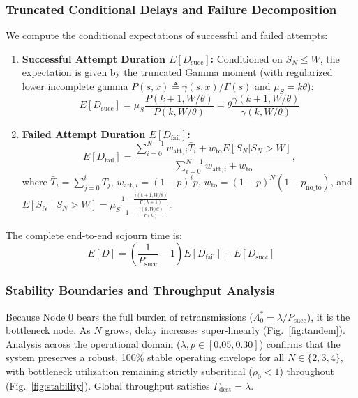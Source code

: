 \documentclass[journal,compsoc]{IEEEtran}
\begin{document}
\subsubsection{Truncated Conditional Delays and Failure Decomposition}
We compute the conditional expectations of successful and failed attempts:
\begin{enumerate}
    \item \textbf{Successful Attempt Duration $E[D_{\text{succ}}]$:} Conditioned on $S_N \le W$, the expectation is given by the truncated Gamma moment (with regularized lower incomplete gamma $P(s, x) \triangleq \gamma(s, x)/\Gamma(s)$ and $\mu_S = k\theta$):
    \begin{equation}
    E[D_{\text{succ}}] = \mu_S \frac{P(k+1, W/\theta)}{P(k, W/\theta)} = \theta \frac{\gamma(k+1, W/\theta)}{\gamma(k, W/\theta)}
    \label{eq:truncated_gamma_succ}
    \end{equation}
    \item \textbf{Failed Attempt Duration $E[D_{\text{fail}}]$:}
    \begin{equation}
    E[D_{\text{fail}}] = \frac{\sum_{i=0}^{N-1} w_{\text{att}, i} \bar{T}_i + w_{\text{to}} E[S_N | S_N > W]}{\sum_{i=0}^{N-1} w_{\text{att}, i} + w_{\text{to}}},
    \end{equation}
    where $\bar{T}_i = \sum_{j=0}^i T_j$, $w_{\text{att}, i} = (1-p)^i p$, $w_{\text{to}} = (1-p)^N (1 - p_{\text{no\_to}})$, and $E[S_N \mid S_N > W] = \mu_S \frac{1 - \frac{\gamma(k+1, W/\theta)}{\Gamma(k+1)}}{1 - \frac{\gamma(k, W/\theta)}{\Gamma(k)}}$.
\end{enumerate}
The complete end-to-end sojourn time is:
\begin{equation}
E[D] = \left(\frac{1}{P_{\text{succ}}} - 1\right) E[D_{\text{fail}}] + E[D_{\text{succ}}]
\end{equation}

\subsubsection{Stability Boundaries and Throughput Analysis}
Because Node 0 bears the full burden of retransmissions ($\Lambda_0^* = \lambda / P_{\text{succ}}$), it is the bottleneck node. As $N$ grows, delay increases super-linearly (Fig.~\ref{fig:tandem}). Analysis across the operational domain ($\lambda, p \in [0.05, 0.30]$) confirms that the system preserves a robust, 100\% stable operating envelope for all $N \in \{2, 3, 4\}$, with bottleneck utilization remaining strictly subcritical ($\rho_0 < 1$) throughout (Fig.~\ref{fig:stability}). Global throughput satisfies $\Gamma_{\text{dest}} = \lambda$.
\end{document}
